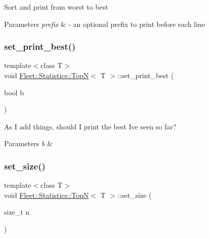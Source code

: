 Sort and print from worst to best 
\begin{DoxyParams}{Parameters}
{\em prefix} & -\/ an optional prefix to print before each line\\
\hline
\end{DoxyParams}
\mbox{\label{class_fleet_1_1_statistics_1_1_top_n_a762c937fe5dcab09d87d2414201b6b1e}} 
\subsubsection{\texorpdfstring{set\+\_\+print\+\_\+best()}{set\_print\_best()}}
{\footnotesize\ttfamily template$<$class T$>$ \\
void \hyperlink{class_fleet_1_1_statistics_1_1_top_n}{Fleet\+::\+Statistics\+::\+TopN}$<$ T $>$\+::set\+\_\+print\+\_\+best (\begin{DoxyParamCaption}\item[{bool}]{b }\end{DoxyParamCaption})\hspace{0.3cm}{\ttfamily [inline]}}

As I add things, should I print the best I\textquotesingle{}ve seen so far? 
\begin{DoxyParams}{Parameters}
{\em b} & \\
\hline
\end{DoxyParams}
\mbox{\label{class_fleet_1_1_statistics_1_1_top_n_a3151da8c2aaab75195d6f702fbfba436}} 
\subsubsection{\texorpdfstring{set\+\_\+size()}{set\_size()}}
{\footnotesize\ttfamily template$<$class T$>$ \\
void \hyperlink{class_fleet_1_1_statistics_1_1_top_n}{Fleet\+::\+Statistics\+::\+TopN}$<$ T $>$\+::set\+\_\+size (\begin{DoxyParamCaption}\item[{size\+\_\+t}]{n }\end{DoxyParamCaption})\hspace{0.3cm}{\ttfamily [inline]}}

